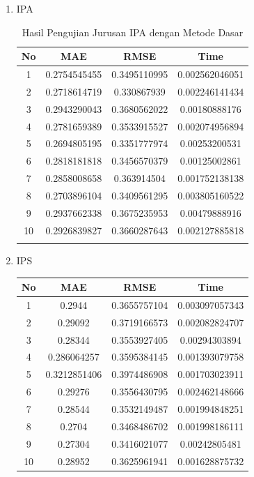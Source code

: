\begin{enumerate}
    \item IPA
        
        \begin{longtable}[H]{|c|c|c|c|}
            \hline
            No & MAE & RMSE & Time\\
            \hline
            1 & 0.2754545455 & 0.3495110995 & 0.002562046051\\
            \hline
            2 & 0.2718614719 & 0.330867939 & 0.002246141434\\
            \hline
            3 & 0.2943290043 & 0.3680562022 & 0.00180888176\\
            \hline 
            4 & 0.2781659389 & 0.3533915527 & 0.002074956894\\
            \hline 
            5 & 0.2694805195 & 0.3351777974 & 0.00253200531\\
            \hline 
            6 & 0.2818181818 & 0.3456570379 & 0.00125002861\\
            \hline 
            7 & 0.2858008658 & 0.363914504 & 0.001752138138\\
            \hline 
            8 & 0.2703896104 & 0.3409561295 & 0.003805160522\\
            \hline 
            9 & 0.2937662338 & 0.3675235953 & 0.00479888916\\
            \hline 
            10 & 0.2926839827 & 0.3660287643 & 0.002127885818\\
            \hline
            
            \caption{Hasil Pengujian Jurusan IPA dengan Metode Dasar}
            \label{tab:pengujian ipa dasar}
        \end{longtable}
        
    \item IPS
        \begin{longtable}[H]{|c|c|c|c|}
            \hline
            No & MAE & RMSE & Time\\
            \hline
            1 & 0.2944 & 0.3655757104 & 0.003097057343\\
            \hline
            2 & 0.29092 & 0.3719166573 & 0.002082824707\\
            \hline
            3 & 0.28344 & 0.3553927405 & 0.00294303894\\
            \hline
            4 & 0.286064257 & 0.3595384145 & 0.001393079758\\
            \hline
            5 & 0.3212851406 & 0.3974486908 & 0.001703023911\\
            \hline
            6 & 0.29276 & 0.3556430795 & 0.002462148666\\
            \hline
            7 & 0.28544 & 0.3532149487 & 0.001994848251\\
            \hline
            8 & 0.2704 & 0.3468486702 & 0.001998186111\\
            \hline
            9 & 0.27304 & 0.3416021077 & 0.00242805481\\
            \hline
            10 & 0.28952 & 0.3625961941 & 0.001628875732\\
            \hline
            

\end{longtable}
\end{enumerate}
